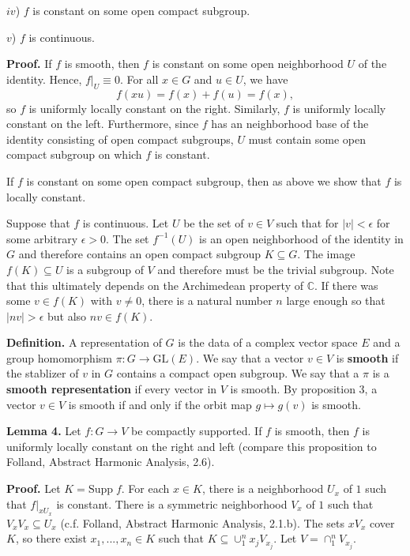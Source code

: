 \documentclass[12pt]{article}
\begin{document}
$iv$) $f$ is constant on some open compact subgroup.

$v$) $f$ is continuous.

\textbf{Proof.} If $f$ is smooth, then $f$ is constant on some open neighborhood
$U$ of the identity. Hence, $f|_{U} \equiv 0$. For all $x \in G$ and $u \in U$,
we have
%
\[f\left(xu\right) = f\left(x\right) + f\left(u\right) = f\left(x\right),\]
%
so $f$ is uniformly locally constant on the right. Similarly, $f$ is uniformly
locally constant on the left. Furthermore, since $f$ has an neighborhood base of
the identity consisting of open compact subgroups, $U$ must contain some open
compact subgroup on which $f$ is constant. 

If $f$ is constant on some open compact subgroup, then as above we show that $f$
is locally constant.

Suppose that $f$ is continuous. Let $U$ be the set of $v \in V$ such that for
$\left|v\right| < \epsilon$ for some arbitrary $\epsilon > 0$. The set
$f^{-1}\left(U\right)$ is an open neighborhood of the identity in $G$ and
therefore contains an open compact subgroup $K \subseteq G$. The image
$f\left(K\right) \subseteq U$ is a subgroup of $V$ and therefore must be the
trivial subgroup. Note that this ultimately depends on the Archimedean property
of $\mathbb{C}$. If there was some $v \in f\left(K\right)$ with $v \neq 0$,
there is a natural number $n$ large enough so that $\left|nv\right| > \epsilon$
but also $nv \in f\left(K\right)$.

\textbf{Definition.} A representation of $G$ is the data of a complex vector
space $E$ and a group homomorphism $\pi : G \rightarrow
\text{GL}\left(E\right)$. We say that a vector $v \in V$ is \textbf{smooth} if
the stablizer of $v$ in $G$ contains a compact open subgroup. We say that a
$\pi$ is a \textbf{smooth representation} if every vector in $V$ is smooth. By
proposition 3, a vector $v \in V$ is smooth if and only if the orbit map $g
\mapsto g\left(v\right)$ is smooth.

\textbf{Lemma 4.} Let $f : G \rightarrow V$ be compactly supported. If $f$ is
smooth, then $f$ is uniformly locally constant on the right and left (compare
this proposition to Folland, Abstract Harmonic Analysis, 2.6).

\textbf{Proof.} Let $K = \text{Supp} \; f$. For each $x \in K$, there is a
neighborhood $U_{x}$ of $1$ such that $f|_{xU_{x}}$ is constant. There is a
symmetric neighborhood $V_{x}$ of $1$ such that $V_{x} V_{x} \subseteq U_{x}$
(c.f. Folland, Abstract Harmonic Analysis, 2.1.b). The sets $x V_{x}$ cover $K$,
so there exist $x_1, ..., x_{n} \in K$ such that $K \subseteq \cup_{1}^{n}
x_{j}V_{x_{j}}$. Let $V = \cap_{1}^{n} V_{x_{j}}$.
\end{document}
